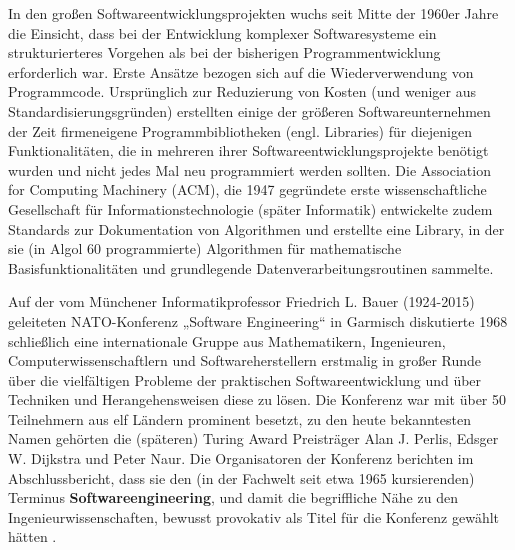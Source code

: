
In den großen Softwareentwicklungsprojekten wuchs seit Mitte der 1960er Jahre die Einsicht, dass bei der Entwicklung komplexer Softwaresysteme ein strukturierteres Vorgehen als bei der bisherigen Programmentwicklung erforderlich war. Erste Ansätze bezogen sich auf die Wiederverwendung von Programmcode. Ursprünglich zur Reduzierung von Kosten (und weniger aus Standardisierungsgründen) erstellten einige der größeren Softwareunternehmen der Zeit firmeneigene Programmbibliotheken (engl. Libraries) 
für diejenigen Funktionalitäten, die in mehreren ihrer Softwareentwicklungsprojekte benötigt wurden und nicht jedes Mal neu programmiert werden sollten. Die Association for Computing Machinery (ACM), die 1947 gegründete erste wissenschaftliche Gesellschaft für Informationstechnologie (später Informatik) entwickelte zudem Standards zur Dokumentation von Algorithmen und erstellte eine Library, in der sie (in Algol 60 programmierte) Algorithmen für mathematische Basis\-funktionalitäten und grundlegende Datenverarbeitungsroutinen sammelte. 

\label{sec:Kap-1.1:NATO-Konferenz}

Auf der vom Münchener Informatikprofessor Friedrich L. Bauer (1924-2015) geleiteten NATO-Konferenz „Software Engineering“ in Garmisch diskutierte 1968 schließlich eine internationale Gruppe aus Mathematikern, Ingenieuren, Computerwissenschaftlern und Softwareherstellern erstmalig in großer Runde über die vielfältigen Probleme der praktischen Softwareentwicklung und über Techniken und Heran\-gehens\-weisen diese zu lösen. Die Konferenz war mit über 50 Teilnehmern aus elf Ländern prominent besetzt, zu den heute bekanntesten Namen gehörten die (späteren) Turing Award Preisträger Alan J. Perlis, Edsger W. Dijkstra und Peter Naur. Die Organisatoren der Konferenz berichten im Abschlussbericht, dass sie den (in der Fachwelt seit etwa 1965 kursierenden) Terminus \textbf{Softwareengineering}, und damit die begriffliche Nähe zu den Ingenieurwissenschaften, bewusst provokativ als Titel für die Konferenz gewählt hätten \cite[13]{nau69}. 

